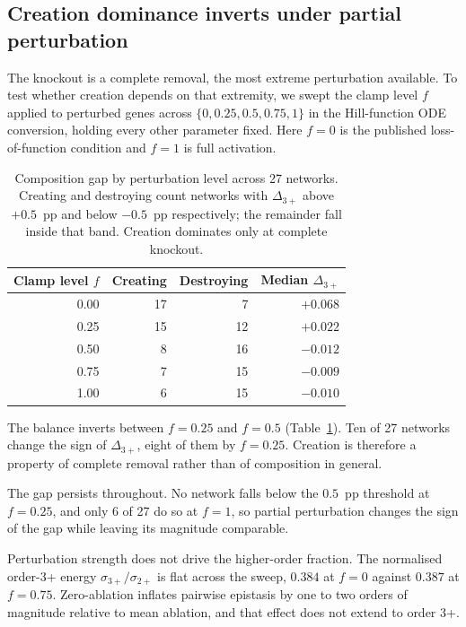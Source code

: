 \documentclass[10pt]{article}
\begin{document}
\subsection{Creation dominance inverts under partial perturbation}
\label{sec:graded}

The knockout is a complete removal, the most extreme perturbation
available. To test whether creation depends on that extremity, we swept
the clamp level $f$ applied to perturbed genes across
$\{0, 0.25, 0.5, 0.75, 1\}$ in the Hill-function ODE conversion, holding
every other parameter fixed. Here $f = 0$ is the published
loss-of-function condition and $f = 1$ is full activation.

\begin{table}[h]
\centering\small
\begin{tabular}{rrrr}
\toprule
Clamp level $f$ & Creating & Destroying & Median $\Delta_{3+}$ \\
\midrule
0.00 & 17 & 7  & $+0.068$ \\
0.25 & 15 & 12 & $+0.022$ \\
0.50 & 8  & 16 & $-0.012$ \\
0.75 & 7  & 15 & $-0.009$ \\
1.00 & 6  & 15 & $-0.010$ \\
\bottomrule
\end{tabular}
\caption{Composition gap by perturbation level across 27 networks.
Creating and destroying count networks with $\Delta_{3+}$ above
$+0.5$~pp and below $-0.5$~pp respectively; the remainder fall inside
that band. Creation dominates only at complete knockout.}
\label{tab:graded}
\end{table}

The balance inverts between $f = 0.25$ and $f = 0.5$
(Table~\ref{tab:graded}). Ten of 27 networks change the sign of
$\Delta_{3+}$, eight of them by $f = 0.25$. Creation is therefore a
property of complete removal rather than of composition in general.

The gap persists throughout. No network falls below the $0.5$~pp
threshold at $f = 0.25$, and only 6 of 27 do so at $f = 1$, so partial
perturbation changes the sign of the gap while leaving its magnitude
comparable.

Perturbation strength does not drive the higher-order fraction. The
normalised order-3+ energy $\sigma_{3+}/\sigma_{2+}$ is flat across the
sweep, $0.384$ at $f = 0$ against $0.387$ at $f = 0.75$. Zero-ablation
inflates pairwise epistasis by one to two orders of magnitude relative
to mean ablation, and that effect does not extend to order 3+.
\end{document}
